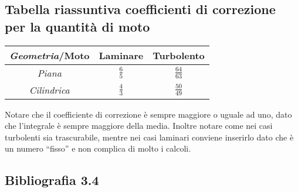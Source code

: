\subsection{Tabella riassuntiva coefficienti di correzione per la quantità di moto}
%
	\begin{table}[H]
		\begin{tabular}{ccc}
			\toprule
				\textit{Geometria}/\textbf{Moto}	&	\textbf{Laminare}	&	\textbf{Turbolento}\\
			\midrule
				\textit{Piana}		&	$\frac{6}{5}$	&	$\frac{64}{63}$ \\
			\midrule
				\textit{Cilindrica} 	&	$\frac{4}{3}$	&	$\frac{50}{49}$\\
			\bottomrule
		\end{tabular}
	\end{table}
%
Notare che il coefficiente di correzione è sempre maggiore o uguale ad uno, dato che l'integrale è sempre maggiore della media.
Inoltre notare come nei casi turbolenti sia trascurabile, mentre nei casi laminari conviene inserirlo dato che è un numero ``fisso'' e non complica di molto i calcoli.

\subsection*{Bibliografia 3.4}
\cite[Cap.\ 4.5, 4.6, 4.7, 4.85.1, 5.2]{CengelCimbala}\\
\cite[Cap.\ 6.4]{PnueliGutfinger}